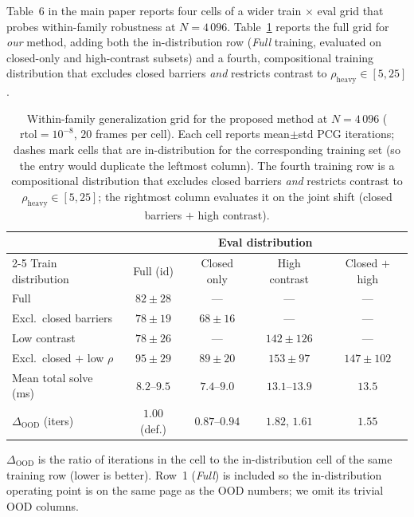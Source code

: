 \documentclass[acmtog]{acmart}
\begin{document}
Table~6 in the main paper reports four cells of a wider train$\,\times\,$eval
grid that probes within-family robustness at $N\!=\!4\,096$.
Table~\ref{supp-tab:generalization} reports the full grid for \emph{our}
method, adding both the in-distribution row (\emph{Full} training,
evaluated on closed-only and high-contrast subsets) and a fourth,
compositional training distribution that excludes closed barriers
\emph{and} restricts contrast to $\rho_{\text{heavy}}\!\in\![5,25]$.

\begin{table}[H]
\centering
\caption{Within-family generalization grid for the proposed method at
$N\!=\!4\,096$ ($\mathrm{rtol}\!=\!10^{-8}$, $20$ frames per cell). Each cell
reports mean$\pm$std PCG iterations; dashes mark cells that are
in-distribution for the corresponding training set (so the entry would
duplicate the leftmost column). The fourth training row is a compositional
distribution that excludes closed barriers \emph{and} restricts contrast to
$\rho_{\text{heavy}}\!\in\![5,25]$; the rightmost column evaluates it on the
joint shift (closed barriers $+$ high contrast).}
\label{supp-tab:generalization}
\footnotesize\setlength{\tabcolsep}{4pt}
\begin{tabular}{@{}l cccc@{}}
\toprule
& \multicolumn{4}{c}{Eval distribution} \\
\cmidrule(lr){2-5}
Train distribution & Full (id) & Closed only & High contrast & Closed $+$ high \\
\midrule
Full                          & $82\!\pm\!28$  & ---            & ---             & ---             \\
Excl.\ closed barriers        & $78\!\pm\!19$  & $68\!\pm\!16$  & ---             & ---             \\
Low contrast                  & $78\!\pm\!26$  & ---            & $142\!\pm\!126$ & ---             \\
Excl.\ closed $+$ low $\rho$  & $95\!\pm\!29$  & $89\!\pm\!20$  & $153\!\pm\!97$  & $147\!\pm\!102$ \\
\midrule
Mean total solve (ms)         & $8.2$--$9.5$   & $7.4$--$9.0$   & $13.1$--$13.9$  & $13.5$          \\
$\Delta_{\text{OOD}}$ (iters) & $1.00$ (def.)  & $0.87$--$0.94$ & $1.82$, $1.61$  & $1.55$          \\
\bottomrule
\end{tabular}
\end{table}

\noindent
$\Delta_{\text{OOD}}$ is the ratio of iterations in the cell to the
in-distribution cell of the same training row (lower is better). Row~1
(\emph{Full}) is included so the in-distribution operating point is on the
same page as the OOD numbers; we omit its trivial OOD columns.
\end{document}
